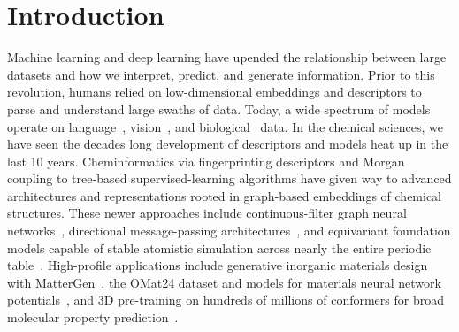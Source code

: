 \section{Introduction}
\label{sec:intro}

Machine learning and deep learning have upended the relationship between large datasets
and how we interpret, predict, and generate information.
Prior to this revolution, humans relied on low-dimensional embeddings and descriptors to 
parse and understand large swaths of data. Today, a wide spectrum of models operate on language~\citep{gpt3},
vision~\citep{yolo,sam}, and biological~\citep{alphafold2} data. In the chemical sciences, we have seen the decades long
development of descriptors and models heat up in the last 10 years. Cheminformatics via 
fingerprinting descriptors \citep{ecfp} and Morgan~\citep{morgan1965} coupling to tree-based supervised-learning algorithms\cite{ahneman2018}
have given way to advanced architectures and representations rooted in graph-based embeddings 
of chemical structures. These newer approaches include continuous-filter graph neural
networks~\citep{schnet}, directional message-passing architectures~\citep{dimenetpp},
and equivariant foundation models capable of stable atomistic simulation across
nearly the entire periodic table~\citep{macemp}. High-profile applications include
generative inorganic materials design with MatterGen~\citep{mattergen}, the OMat24
dataset and models for materials neural network potentials~\citep{omat24}, and 3D
pre-training on hundreds of millions of conformers for broad molecular property
prediction~\citep{unimol}.



